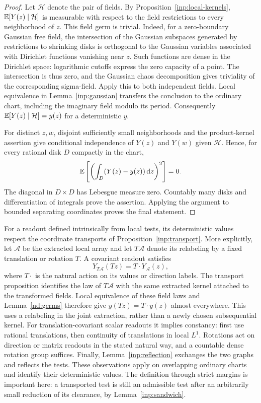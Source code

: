 \begin{proof}
Let $\mathcal H$ denote the pair of fields.  By
Proposition~\ref{inp:local-kernels},
$\mathbb E[Y(z)\mid\mathcal H]$ is measurable with respect to the field
restrictions to every neighborhood of $z$.  This field germ is
trivial.  Indeed, for a zero-boundary Gaussian free field, the
intersection of the Gaussian subspaces generated by restrictions
to shrinking disks is orthogonal to the Gaussian variables
associated with Dirichlet functions vanishing near $z$.  Such
functions are dense in the Dirichlet space: logarithmic cutoffs
express the zero capacity of a point.  The intersection is thus
zero, and the Gaussian chaos decomposition gives triviality of
the corresponding sigma-field.  Apply this to both independent
fields.  Local equivalence in Lemma~\ref{inp:gaussian}
transfers the conclusion to the ordinary chart, including the
imaginary field modulo its period.  Consequently
$\mathbb E[Y(z)\mid\mathcal H]=y(z)$ for a deterministic $y$.

For distinct $z,w$, disjoint sufficiently small neighborhoods and
the product-kernel assertion give conditional independence of
$Y(z)$ and $Y(w)$ given $\mathcal H$.  Hence, for every rational
disk $D$ compactly in the chart,
\[
 \mathbb E\left[\left(\int_D(Y(z)-y(z))\,\mathrm d z\right)^2\right]=0.
\]
The diagonal in $D\times D$ has Lebesgue measure zero.  Countably
many disks and differentiation of integrals prove the assertion.
Applying the argument to bounded separating coordinates proves
the final statement.
\end{proof}

\begin{remark}\label{nd:germ-symmetries}
For a readout defined intrinsically from local tests, its deterministic
values respect the coordinate transports of
Proposition~\ref{inp:transport}.  More explicitly, let $\mathcal A$
be the extracted local array and let $T\mathcal A$ denote its
relabeling by a fixed translation or rotation $T$.  A covariant
readout satisfies
\[
             Y_{T\mathcal A}(Tz)=T\cdot Y_{\mathcal A}(z),
\]
where $T\cdot$ is the natural action on its values or direction
labels.  The transport proposition identifies the law of
$T\mathcal A$ with the same extracted kernel attached to the
transformed fields.  Local equivalence of these field laws and
Lemma~\ref{nd:germs} therefore give
$y(Tz)=T\cdot y(z)$ almost everywhere.  This uses a relabeling in
the joint extraction, rather than a newly chosen subsequential
kernel.  For translation-covariant scalar readouts it implies
constancy: first use rational translations, then continuity of
translations in local $L^1$.  Rotations act on direction or matrix
readouts in the stated natural way, and a countable dense rotation
group suffices.  Finally, Lemma~\ref{inp:reflection} exchanges the
two graphs and reflects the tests.  These observations apply on
overlapping ordinary charts and identify their deterministic values.
The definition through strict margins is important here: a transported
test is still an admissible test after an arbitrarily small reduction
of its clearance, by Lemma~\ref{inp:sandwich}.
\end{remark}


